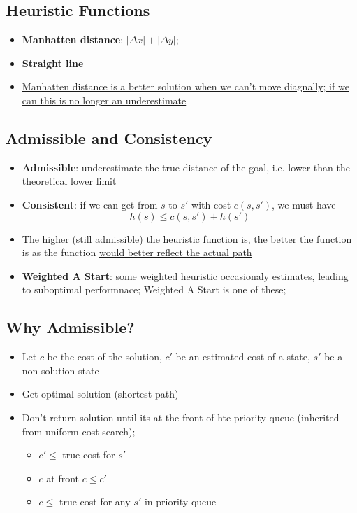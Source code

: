   \subsection{Heuristic Functions}

    \begin{itemize}
      \item \textbf{Manhatten distance}: $\left| \Delta x \right| + \left| \Delta y \right|$;
      \item \textbf{Straight line}
      \item \ul{Manhatten distance is a better solution when we can't
      move diagnally; if we can this is no longer an underestimate}
    \end{itemize}

  \subsection{Admissible and Consistency}

    \begin{itemize}
      \item \textbf{Admissible}: underestimate the true distance of the goal,
      i.e. lower than the theoretical  lower limit
      \item \textbf{Consistent}: if we can get from $ s $ to $ s' $ with cost
      $ c(s,s') $, we must have
      \begin{equation}
        h\left( s \right) \le c\left( s, s' \right) + h\left( s' \right)
      \end{equation}

      \item The higher (still admissible) the heuristic function is, the
      better the function is as the function \ul{would better reflect the
      actual path}
      \item \textbf{Weighted A Start}: some weighted heuristic occasionaly
      estimates, leading to suboptimal performnace; Weighted A Start is one
      of these;
    \end{itemize}

  \subsection{Why Admissible?}

    \begin{itemize}
      \item Let $ c $ be the cost of the solution,
      $ c' $ be an estimated cost of a state, $ s' $ be a non-solution state
      \item Get optimal solution (shortest path)
      \item Don't return solution until its at the front of hte priority
      queue (inherited from uniform cost search);
      \begin{itemize}
        \item $ c' \le $ true cost for $ s' $
        \item $ c $ at front $ c \le c' $
        \item $ c \le $ true cost for any $ s' $ in priority queue
      \end{itemize}
    \end{itemize}

